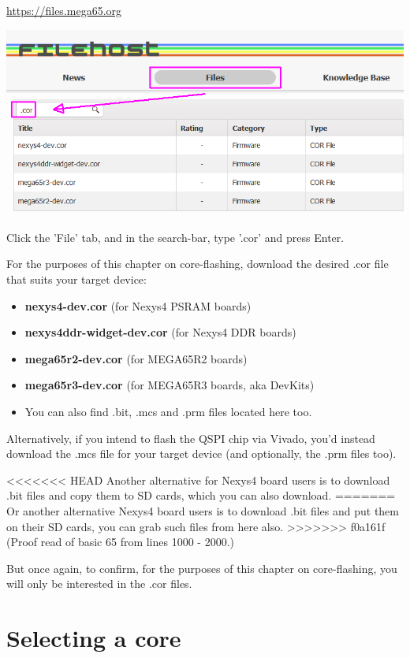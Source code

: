 \url{https://files.mega65.org}

\includegraphics[width=\linewidth]{images/latest_bitstream.png}

Click the 'File' tab, and in the search-bar, type '.cor' and press Enter.

For the purposes of this chapter on core-flashing, download the desired .cor file that suits your target device:

\begin{itemize}
  \item{\textbf{nexys4-dev.cor} (for Nexys4 PSRAM boards)}
  \item{\textbf{nexys4ddr-widget-dev.cor} (for Nexys4 DDR boards)}
  \item{\textbf{mega65r2-dev.cor} (for MEGA65R2 boards)}
  \item{\textbf{mega65r3-dev.cor} (for MEGA65R3 boards, aka DevKits)}
  \item{You can also find .bit, .mcs and .prm files located here too.}
\end{itemize}

Alternatively, if you intend to flash the QSPI chip via Vivado, you'd instead download the .mcs file for your target device (and optionally, the .prm files too).

<<<<<<< HEAD
Another alternative for Nexys4 board users is to download .bit files and copy them to SD cards, which you can also download.
=======
Or another alternative Nexys4 board users is to download .bit files and put them on their SD cards, you can grab such files from here also.
>>>>>>> f0a161f (Proof read of basic 65 from lines 1000 - 2000.)

But once again, to confirm, for the purposes of this chapter on core-flashing, you will only be interested in the .cor files.

\section{Selecting a core}

